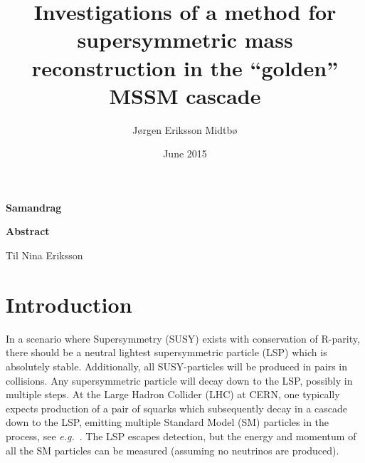 \documentclass[twoside,english]{uiofysmaster}
\author{J\o rgen Eriksson Midtb\o}
\title{Investigations of a method for supersymmetric mass reconstruction in the ``golden'' MSSM cascade}
\date{June 2015}
\newenvironment{abstractpage}
  {\cleardoublepage\vspace*{\fill}\thispagestyle{empty}}
  {\vfill\cleardoublepage}
\renewenvironment{abstract}[1]
  {\bigskip\selectlanguage{#1}%
   }
  {\par\bigskip}
\begin{document}

\cleardoublepage

\begin{abstractpage}

\begin{center}
	\textbf{Samandrag}
\end{center}
\begin{abstract}{norsk}
    \lipsum[1]
\end{abstract}

\begin{center}
	\textbf{Abstract}
\end{center}
\begin{abstract}{english}
    \lipsum[1]
\end{abstract}

\end{abstractpage}


\begin{dedication}
 Til Nina Eriksson
\end{dedication}


\tableofcontents
\listoffigures
\listoftables


\chapter*{Introduction}
In a scenario where Supersymmetry (SUSY) exists with conservation of R-parity, there should be a neutral lightest supersymmetric particle (LSP) which is absolutely stable. Additionally, all SUSY-particles will be produced in pairs in collisions. Any supersymmetric particle will decay down to the LSP, possibly in multiple steps. At the Large Hadron Collider (LHC) at CERN, one typically expects production of a pair of squarks which subsequently decay in a cascade down to the LSP, emitting multiple Standard Model (SM) particles in the process, see {\it e.g.}~\cite{Martin:1997ns}. The LSP escapes detection, but the energy and momentum of all the SM particles can be measured (assuming no neutrinos are produced).
\end{document}
